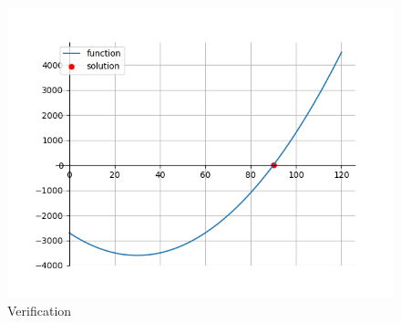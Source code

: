 \documentclass[journal]{IEEEtran}
\begin{document}
    \begin{figure}[ht]  
        \centering  
        \includegraphics[width=\columnwidth]{figs/fig1.png}  
        \caption{Verification}
    \end{figure}
\end{document}
